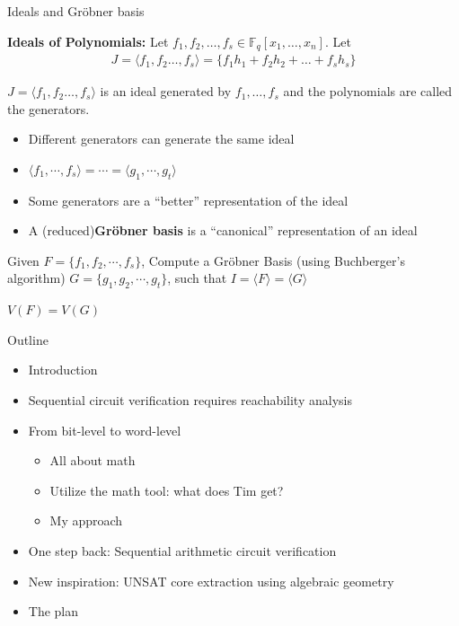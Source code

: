 \documentclass[xcolor=dvipsnames]{beamer}
\newcommand{\Grobner}{Gr\"{o}bner\xspace}
\newcommand{\bi}{\begin{itemize}}
\newcommand{\ei}{\end{itemize}}
\begin{document}
\begin{frame}{\large {Ideals and \Grobner basis}}
\vspace{-0.1in}


\begin{Definition}
{\bf Ideals of Polynomials:} Let $f_1, f_2, \ldots, f_s \in
\mathbb{F}_q[x_1, \dots, x_n]$. Let 
\begin{eqnarray}
J = \langle f_1, f_2 \ldots, f_s\rangle = \{f_1 h_1 + f_2 h_2 + \dots + f_s h_s\} \nonumber 
\end{eqnarray}

$J = \langle f_1, f_2 \ldots, f_s\rangle$ is an ideal generated by
$f_1, \ldots, f_s$ and the polynomials are called the generators. 
\end{Definition}

\vspace{-0.1in}

\begin{itemize}
\item Different generators can generate the same ideal
\item $\langle f_1,\cdots,f_s \rangle=\cdots=\langle g_1,\cdots,g_t
  \rangle$
\item Some generators are a ``better'' representation of the ideal
\item A (reduced){\bf Gr\"obner basis} is a ``canonical'' representation of an ideal
\end{itemize}

Given $F = \{f_1, f_2,\cdots, f_s\}$, Compute a Gr\"obner Basis (using Buchberger's algorithm) $G =
\{g_1,g_2,\cdots,g_t\}$, such that $I = \langle F \rangle = \langle G \rangle$

\begin{center}
$V(F)=V(G)$
\end{center}
\end{frame}

\begin{frame}{\large{Outline}}
\bi
\item Introduction
\item Sequential circuit verification requires reachability analysis
\item From bit-level to word-level
	\bi
	\item All about math
	\item \alert{Utilize the math tool: what does Tim get?}
	\item My approach
	\ei
\item One step back: Sequential arithmetic circuit verification
\item New inspiration: UNSAT core extraction using algebraic geometry
\item The plan
\ei
\end{frame}
\end{document}
